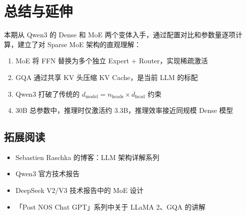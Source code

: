 \section{总结与延伸}

本期从 Qwen3 的 Dense 和 MoE 两个变体入手，通过配置对比和参数量逐项计算，建立了对 Sparse MoE 架构的直观理解：

\begin{enumerate}
  \item MoE 将 FFN 替换为多个独立 Expert + Router，实现稀疏激活
  \item GQA 通过共享 KV 头压缩 KV Cache，是当前 LLM 的标配
  \item Qwen3 打破了传统的 $d_{\text{model}} = n_{\text{heads}} \times d_{\text{head}}$ 约束
  \item 30B 总参数中，推理时仅激活约 3.3B，推理效率接近同规模 Dense 模型
\end{enumerate}

\subsection{拓展阅读}

\begin{itemize}
  \item Sebastien Raschka 的博客：LLM 架构详解系列
  \item Qwen3 官方技术报告
  \item DeepSeek V2/V3 技术报告中的 MoE 设计
  \item 「Post NOS Chat GPT」系列中关于 LLaMA 2、GQA 的讲解
\end{itemize}



